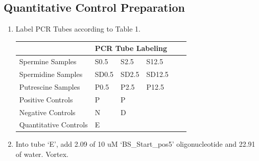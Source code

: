 \documentclass{ssiBio}
\begin{document}
\begin{enumerate}
\end{enumerate}

\subsection{Quantitative Control Preparation}
\begin{enumerate}
\item{Label PCR Tubes according to Table 1.}

\begin{table}[ht]
\begin{tabular}{|l|l|l|l|l|l|}
\hline
                      & \multicolumn{3}{l|}{PCR Tube Labeling} \\ \hline
Spermine Samples      & S0.5   & S2.5   & S12.5         \\ \hline
Spermidine Samples    & SD0.5  & SD2.5  & SD12.5       \\ \hline
Putrescine Samples    & P0.5   & P2.5   & P12.5        \\ \hline
Positive Controls     & P      & P      &                     \\ \hline
Negative Controls     & N      & D      &                     \\ \hline
Quantitative Controls & E      &        &                \\ \hline
\end{tabular}
\end{table}
\item{Into tube `E', add 2.09 \uL{} of 10 uM `BS\_Start\_pos5' oligonucleotide and 22.91 \uL{} of water. Vortex.}

\end{enumerate}

\end{document}
